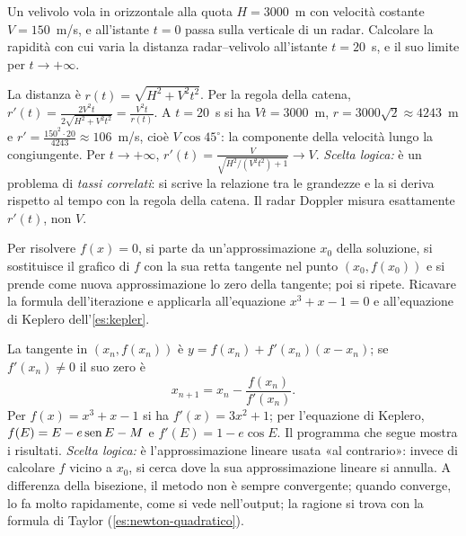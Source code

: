 \begin{esercizio}
Un velivolo vola in orizzontale alla quota $H=3000$~m con velocità costante
$V=150$~m/s, e all'istante $t=0$ passa sulla verticale di un radar. Calcolare la rapidità
con cui varia la distanza radar--velivolo all'istante $t=20$~s, e il suo limite per
$t\to+\infty$.
\begin{soluzione}
La distanza è $r(t)=\sqrt{H^{2}+V^{2}t^{2}}$. Per la regola della catena,
$r'(t)=\frac{2V^{2}t}{2\sqrt{H^{2}+V^{2}t^{2}}}=\frac{V^{2}t}{r(t)}$. A $t=20$~s si ha
$Vt=3000$~m, $r=3000\sqrt2\approx4243$~m e $r'=\frac{150^{2}\cdot20}{4243}\approx106$~m/s, cioè
$V\cos45^{\circ}$: la componente della velocità lungo la congiungente. Per $t\to+\infty$,
$r'(t)=\frac{V}{\sqrt{H^{2}/(V^{2}t^{2})+1}}\to V$. \emph{Scelta logica:} è un problema di
\emph{tassi correlati}: si scrive la relazione tra le grandezze e la si deriva rispetto al
tempo con la regola della catena. Il radar Doppler misura esattamente $r'(t)$, non $V$.
\end{soluzione}
\end{esercizio}

\begin{esercizio}\label{es:newton}
Per risolvere $f(x)=0$, si parte da un'approssimazione $x_{0}$ della soluzione, si sostituisce
il grafico di $f$ con la sua retta tangente nel punto $(x_{0},f(x_{0}))$ e si prende come
nuova approssimazione lo zero della tangente; poi si ripete. Ricavare la formula
dell'iterazione e applicarla all'equazione $x^{3}+x-1=0$ e all'equazione di Keplero
dell'\cref{es:kepler}.
\begin{soluzione}
La tangente in $(x_{n},f(x_{n}))$ è $y=f(x_{n})+f'(x_{n})(x-x_{n})$; se $f'(x_{n})\neq0$ il suo
zero è
\[
  x_{n+1}=x_{n}-\frac{f(x_{n})}{f'(x_{n})}.
\]
Per $f(x)=x^{3}+x-1$ si ha $f'(x)=3x^{2}+1$; per l'equazione di Keplero,
$f(E)=E-e\operatorname{sen} E-M$ e $f'(E)=1-e\cos E$. Il programma che segue mostra i risultati.
\emph{Scelta logica:} è l'approssimazione lineare usata «al contrario»: invece di calcolare
$f$ vicino a $x_{0}$, si cerca dove la sua approssimazione lineare si annulla. A differenza
della bisezione, il metodo non è sempre convergente; quando converge, lo fa molto
rapidamente, come si vede nell'output; la ragione si trova con la formula di Taylor
(\cref{es:newton-quadratico}).
\end{soluzione}
\end{esercizio}

